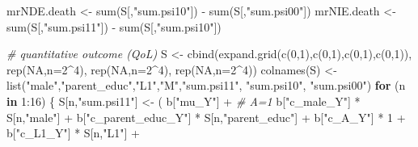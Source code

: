 \documentclass[
]{book}
\newenvironment{Shaded}{\begin{snugshade}}{\end{snugshade}}
\newcommand{\AttributeTok}[1]{\textcolor[rgb]{0.77,0.63,0.00}{#1}}
\newcommand{\CommentTok}[1]{\textcolor[rgb]{0.56,0.35,0.01}{\textit{#1}}}
\newcommand{\ConstantTok}[1]{\textcolor[rgb]{0.00,0.00,0.00}{#1}}
\newcommand{\ControlFlowTok}[1]{\textcolor[rgb]{0.13,0.29,0.53}{\textbf{#1}}}
\newcommand{\DecValTok}[1]{\textcolor[rgb]{0.00,0.00,0.81}{#1}}
\newcommand{\FunctionTok}[1]{\textcolor[rgb]{0.00,0.00,0.00}{#1}}
\newcommand{\NormalTok}[1]{#1}
\newcommand{\OtherTok}[1]{\textcolor[rgb]{0.56,0.35,0.01}{#1}}
\newcommand{\SpecialCharTok}[1]{\textcolor[rgb]{0.00,0.00,0.00}{#1}}
\newcommand{\StringTok}[1]{\textcolor[rgb]{0.31,0.60,0.02}{#1}}
\begin{document}
\begin{Shaded}
\begin{Highlighting}[]
\NormalTok{  mrNDE.death }\OtherTok{\textless{}{-}} \FunctionTok{sum}\NormalTok{(S[,}\StringTok{"sum.psi10"}\NormalTok{]) }\SpecialCharTok{{-}} \FunctionTok{sum}\NormalTok{(S[,}\StringTok{"sum.psi00"}\NormalTok{])}
\NormalTok{  mrNIE.death }\OtherTok{\textless{}{-}} \FunctionTok{sum}\NormalTok{(S[,}\StringTok{"sum.psi11"}\NormalTok{]) }\SpecialCharTok{{-}} \FunctionTok{sum}\NormalTok{(S[,}\StringTok{"sum.psi10"}\NormalTok{])}
  
  \CommentTok{\# quantitative outcome (QoL)}
\NormalTok{  S }\OtherTok{\textless{}{-}} \FunctionTok{cbind}\NormalTok{(}\FunctionTok{expand.grid}\NormalTok{(}\FunctionTok{c}\NormalTok{(}\DecValTok{0}\NormalTok{,}\DecValTok{1}\NormalTok{),}\FunctionTok{c}\NormalTok{(}\DecValTok{0}\NormalTok{,}\DecValTok{1}\NormalTok{),}\FunctionTok{c}\NormalTok{(}\DecValTok{0}\NormalTok{,}\DecValTok{1}\NormalTok{),}\FunctionTok{c}\NormalTok{(}\DecValTok{0}\NormalTok{,}\DecValTok{1}\NormalTok{)), }\FunctionTok{rep}\NormalTok{(}\ConstantTok{NA}\NormalTok{,}\AttributeTok{n=}\DecValTok{2}\SpecialCharTok{\^{}}\DecValTok{4}\NormalTok{), }
             \FunctionTok{rep}\NormalTok{(}\ConstantTok{NA}\NormalTok{,}\AttributeTok{n=}\DecValTok{2}\SpecialCharTok{\^{}}\DecValTok{4}\NormalTok{), }\FunctionTok{rep}\NormalTok{(}\ConstantTok{NA}\NormalTok{,}\AttributeTok{n=}\DecValTok{2}\SpecialCharTok{\^{}}\DecValTok{4}\NormalTok{))}
  \FunctionTok{colnames}\NormalTok{(S) }\OtherTok{\textless{}{-}} \FunctionTok{list}\NormalTok{(}\StringTok{"male"}\NormalTok{,}\StringTok{"parent\_educ"}\NormalTok{,}\StringTok{"L1"}\NormalTok{,}\StringTok{"M"}\NormalTok{,}\StringTok{"sum.psi11"}\NormalTok{, }\StringTok{"sum.psi10"}\NormalTok{, }
                      \StringTok{"sum.psi00"}\NormalTok{)}
  \ControlFlowTok{for}\NormalTok{ (n }\ControlFlowTok{in} \DecValTok{1}\SpecialCharTok{:}\DecValTok{16}\NormalTok{) \{}
\NormalTok{    S[n,}\StringTok{"sum.psi11"}\NormalTok{] }\OtherTok{\textless{}{-}}\NormalTok{  ( b[}\StringTok{"mu\_Y"}\NormalTok{] }\SpecialCharTok{+}                                          \CommentTok{\# A=1}
\NormalTok{                             b[}\StringTok{"c\_male\_Y"}\NormalTok{] }\SpecialCharTok{*}\NormalTok{ S[n,}\StringTok{"male"}\NormalTok{] }\SpecialCharTok{+} 
\NormalTok{                             b[}\StringTok{"c\_parent\_educ\_Y"}\NormalTok{] }\SpecialCharTok{*}\NormalTok{ S[n,}\StringTok{"parent\_educ"}\NormalTok{] }\SpecialCharTok{+} 
\NormalTok{                             b[}\StringTok{"c\_A\_Y"}\NormalTok{] }\SpecialCharTok{*} \DecValTok{1} \SpecialCharTok{+} 
\NormalTok{                             b[}\StringTok{"c\_L1\_Y"}\NormalTok{] }\SpecialCharTok{*}\NormalTok{ S[n,}\StringTok{"L1"}\NormalTok{] }\SpecialCharTok{+}

\end{Highlighting}
\end{Shaded}
\end{document}
